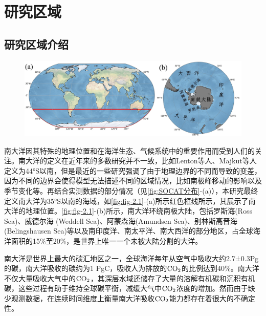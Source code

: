 
\section{研究区域}
\subsection{研究区域介绍}
\begin{figure}[H]
    \centering
    \includegraphics[width=\linewidth]{figure/第二章用图/图2.1-1.jpg}
\end{figure}
南大洋因其特殊的地理位置和在海洋生态、气候系统中的重要作用而受到人们的关注\cite{DXJZ201204005,JDYZ200901008,JDYZ200103003}。南大洋的定义在近年来的多数研究并不一致，比如Lenton等人\cite{lenton2013sea}、Majkut等人\cite{majkut2014observing}定义为44°S以南，但是最近的一些研究\cite{seferian2012water,sokolov2009circumpolar}强调了由于地理边界的不同而导致的变差，因为不同的边界会使得模型无法描述不同的区域情况，比如南极峰移动的影响以及季节变化等。再结合实测数据的部分情况（见\autoref{fig:SOCAT分布}-(a)），本研究最终定义南大洋为35°S以南的海域，如\autoref{fig:fig-2.1}-(a)所示红色框线所示，其展示了南大洋的地理位置。\autoref{fig:fig-2.1}-(b)所示，南大洋环绕南极大陆，包括罗斯海(Ross Sea)、威德尔海 (Weddell Sea)、阿蒙森海(Amundsen Sea)、别林斯高晋海(Belingshausen Sea)等以及南印度洋、南太平洋、南大西洋的部分地区，占全球海洋面积的15\%至20\%，是世界上唯一一个未被大陆分割的大洋。

南大洋是世界上最大的碳汇地区之一，全球海洋每年从空气中吸收大约2.7±0.3Pg的碳，南大洋吸收的碳约为1 PgC，吸收人为排放的$\rm CO_2$的比例达到40\%\cite{khatiwala2009reconstruction,devries2014oceanic}。南大洋不仅大量吸收大气中的$\rm CO_2$，其深层水域还储存了大量的溶解有机碳和沉积有机碳\cite{JDYZ200103003}，这些过程有助于维持全球碳平衡，减缓大气中$\rm CO_2$浓度的增加。然而由于缺少观测数据，在连续时间维度上衡量南大洋吸收$\rm CO_2$能力都存在着很大的不确定性。

